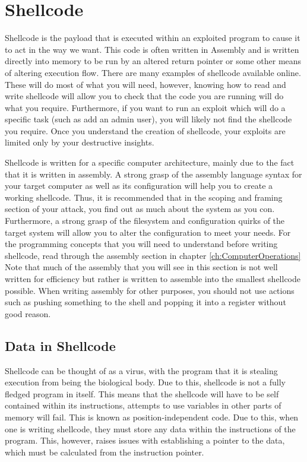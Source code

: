 \documentclass[a4paper,11pt]{report}
\begin{document}
	\section{Shellcode}
		Shellcode is the payload that is executed within an exploited program to cause it to act in the way we want.\cite{HackingAOE} 
		This code is often written in Assembly and is written directly into memory to be run by an altered return pointer or some other means of altering execution flow. 
		There are many examples of shellcode available online. 
		These will do most of what you will need, however, knowing how to read and write shellcode will allow you to check that the code you are running will do what you require. 
		Furthermore, if you want to run an exploit which will do a specific task (such as add an admin user), you will likely not find the shellcode you require. 
		Once you understand the creation of shellcode, your exploits are limited only by your destructive insights. 

		Shellcode is written for a specific computer architecture, mainly due to the fact that it is written in assembly.
		A strong grasp of the assembly language syntax for your target computer as well as its configuration will help you to create a working shellcode. 
		Thus, it is recommended that in the scoping and framing section of your attack, you find out as much about the system as you con. 
		Furthermore, a strong grasp of the filesystem and configuration quirks of the target system will allow you to alter the configuration to meet your needs. 
		For the programming concepts that you will need to understand before writing shellcode, read through the assembly section in chapter \ref{ch:ComputerOperations}
		Note that much of the assembly that you will see in this section is not well written for efficiency but rather is written to assemble into the smallest shellcode possible. 
		When writing assembly for other purposes, you should not use actions such as pushing something to the shell and popping it into a register without good reason. 
		\subsection{Data in Shellcode}
			Shellcode can be thought of as a virus, with the program that it is stealing execution from being the biological body. 
			Due to this, shellcode is not a fully fledged program in itself. 
			This means that the shellcode will have to be self contained within its instructions, attempts to use variables in other parts of memory will fail. 
			This is known as position-independent code. 
			Due to this, when one is writing shellcode, they must store any data within the instructions of the program. 
			This, however, raises issues with establishing a pointer to the data, which must be calculated from the instruction pointer. 
		
\end{document}
